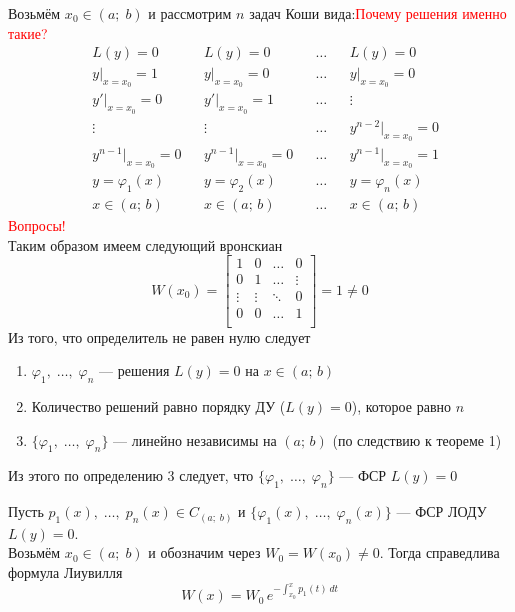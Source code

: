\begin{Proof}
    Возьмём $x_0 \in (a;\;b)$ и рассмотрим $n$ задач Коши вида:\textcolor{red}{Почему решения именно такие?}
    \begin{align*}
        &L(y) = 0 && L(y) = 0 && \dots &&  L(y) = 0\\
        &y|_{x=x_0} = 1 && y|_{x=x_0} = 0 && \dots &&  y|_{x=x_0} = 0\\
        &y'|_{x=x_0} = 0 && y'|_{x=x_0} = 1 && \dots && \vdots \\
        &\vdots && \vdots && \dots && y^{n-2}|_{x=x_0} = 0\\
        &y^{n-1}|_{x=x_0} = 0 && y^{n-1}|_{x=x_0} = 0 && \dots && y^{n-1}|_{x=x_0} = 1\\
        & y = \varphi_1(x) && y = \varphi_2(x) && \dots && y = \varphi_n(x)\\
        & x \in(a;\,b) && x \in(a;\,b) && \dots  && x \in(a;\,b)
    \end{align*}
    \textcolor{red}{Вопросы!}\\
    Таким образом имеем следующий вронскиан
    \[
        W(x_0) = \begin{bmatrix}
            1 & 0 & \dots & 0\\
            0 & 1 & \dots & \vdots\\
            \vdots & \vdots & \ddots & 0\\
            0 & 0 & \dots & 1\\
        \end{bmatrix} = 1 \neq 0
    \]
    Из того, что определитель не равен нулю следует
    \begin{enumerate}
        \item $\varphi_1,\; \dots,\; \varphi_n$ --- решения $L(y) = 0$ на $x \in(a;\,b)$
        \item Количество решений равно порядку ДУ ($L(y) = 0$), которое равно $n$ 
        \item $\{\varphi_1,\; \dots,\; \varphi_n\}$ --- линейно независимы на $(a;\,b)$ (по следствию к теореме 1)
    \end{enumerate}
    Из этого по определению 3 следует, что $\{\varphi_1,\; \dots,\; \varphi_n\}$ --- ФСР $L(y) = 0$\\
\end{Proof}

\begin{Th}
    Пусть $p_1(x),\; \dots,\; p_n(x) \in C_{(a;\;b)}$ и $\{\varphi_1(x),\; \dots,\; \varphi_n(x)\}$ --- ФСР ЛОДУ $L(y) = 0$.\\
    
    Возьмём $x_0 \in (a;\;b)$ и обозначим через $W_0 = W(x_0) \neq 0$. Тогда справедлива формула Лиувилля
    \[
        W(x) = W_0\,e^{- \int_{x_0}^x p_1(t)\,dt}
    \]
\end{Th}

